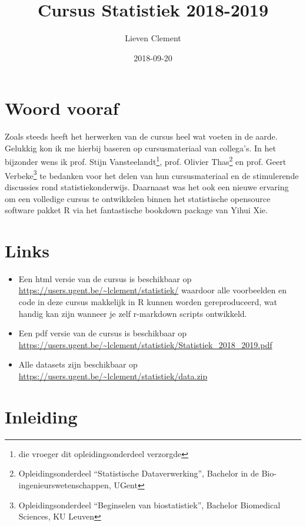 \documentclass[12pt,dutch,coursenotes]{book}
\title{Cursus Statistiek 2018-2019}
\author{Lieven Clement}
\date{2018-09-20}
\providecommand{\tightlist}{%
  \setlength{\itemsep}{0pt}\setlength{\parskip}{0pt}}
\let\rmarkdownfootnote\footnote%
\def\footnote{\protect\rmarkdownfootnote}
\theoremstyle{definition}
\theoremstyle{definition}
\theoremstyle{definition}
\theoremstyle{remark}
\begin{document}
\maketitle

{
\setcounter{tocdepth}{1}
\tableofcontents
}
\chapter*{Woord vooraf}\label{woord-vooraf}

Zoals steeds heeft het herwerken van de cursus heel wat voeten in de
aarde. Gelukkig kon ik me hierbij baseren op cursusmateriaal van
collega's. In het bijzonder wens ik prof. Stijn Vansteelandt\footnote{die
  vroeger dit opleidingsonderdeel verzorgde}, prof. Olivier
Thas\footnote{Opleidingsonderdeel ``Statistische Dataverwerking'',
  Bachelor in de Bio-ingenieurswetenschappen, UGent} en prof. Geert
Verbeke\footnote{Opleidingsonderdeel ``Beginselen van biostatistiek'',
  Bachelor Biomedical Sciences, KU Leuven} te bedanken voor het delen
van hun cursusmateriaal en de stimulerende discussies rond
statistiekonderwijs. Daarnaast was het ook een nieuwe ervaring om een
volledige cursus te ontwikkelen binnen het statistische opensource
software pakket R via het fantastische bookdown package van Yihui Xie.

\chapter*{Links}\label{links}

\begin{itemize}
\tightlist
\item
  Een html versie van de cursus is beschikbaar op
  \url{https://users.ugent.be/~lclement/statistiek/} waardoor alle
  voorbeelden en code in deze cursus makkelijk in R kunnen worden
  gereproduceerd, wat handig kan zijn wanneer je zelf r-markdown scripts
  ontwikkeld.
\item
  Een pdf versie van de cursus is beschikbaar op
  \url{https://users.ugent.be/~lclement/statistiek/Statistiek_2018_2019.pdf}
\item
  Alle datasets zijn beschikbaar op
  \url{https://users.ugent.be/~lclement/statistiek/data.zip}
\end{itemize}

\chapter{Inleiding}\label{inleiding}
\end{document}
